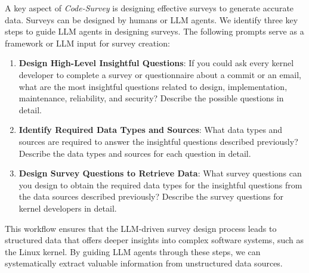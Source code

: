 A key aspect of \emph{Code-Survey} is designing effective surveys to generate accurate data. Surveys can be designed by humans or LLM agents. We identify three key steps to guide LLM agents in designing surveys. The following prompts serve as a framework or LLM input for survey creation:

\begin{enumerate}
    \item \textbf{Design High-Level Insightful Questions}: If you could ask every kernel developer to complete a survey or questionnaire about a commit or an email, what are the most insightful questions related to design, implementation, maintenance, reliability, and security? Describe the possible questions in detail.

    \item \textbf{Identify Required Data Types and Sources}: What data types and sources are required to answer the insightful questions described previously? Describe the data types and sources for each question in detail.

    \item \textbf{Design Survey Questions to Retrieve Data}: What survey questions can you design to obtain the required data types for the insightful questions from the data sources described previously? Describe the survey questions for kernel developers in detail.

\end{enumerate}

This workflow ensures that the LLM-driven survey design process leads to structured data that offers deeper insights into complex software systems, such as the Linux kernel. By guiding LLM agents through these steps, we can systematically extract valuable information from unstructured data sources.
